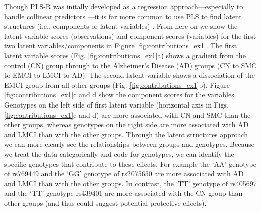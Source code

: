 \documentclass[12pt]{article}
\begin{document}
Though PLS-R was initally developed as a regression
approach---especially to handle collinear predictors \citep[see
explanations in][]{wold_collinearity_1984}---it is far more common to
use PLS to find latent structures (i.e., components or latent variables)
\citep{abdi_partial_2010-1}. From here on we show the latent variable
scores (observations) and component scores (variables) for the first two
latent variables/components in Figure \ref{fig:contributions_ex1}. The
first latent variable scores (Fig. \ref{fig:contributions_ex1}a) shows a
gradient from the control (CN) group through to the Alzheimer's Disease
(AD) groups (CN to SMC to EMCI to LMCI to AD). The second latent
variable shows a dissociation of the EMCI group from all other groups
(Fig. \ref{fig:contributions_ex1}b). Figure \ref{fig:contributions_ex1}c
and d show the component scores for the variables. Genotypes on the left
side of first latent variable (horizontal axis in Figs.
\ref{fig:contributions_ex1}c and d) are more associated with CN and SMC
than the other groups, whereas genotypes on the right side are more
associated with AD and LMCI than with the other groups. Through the
latent structures approach we can more clearly see the relationships
between groups and genotypes. Because we treat the data categorically
and code for genotypes, we can identify the specific genotypes that
contribute to these effects. For example the `AA' genotype of rs769449
and the `GG' genotype of rs2075650 are more associated with AD and LMCI
than with the other groups. In contrast, the `TT' genotype of rs405697
and the `TT' genotype rs439401 are more associated with the CN group
than other groups (and thus could suggest potential protective effects).
\end{document}
